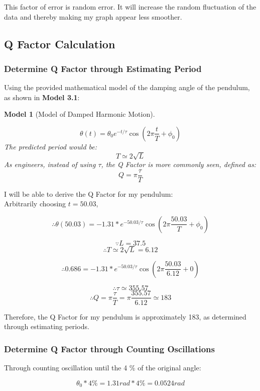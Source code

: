 \documentclass{article}
\newtheorem{theorem}{Model}[section]
\begin{document}
\noindent This factor of error is random error. It will increase the random fluctuation of the data and thereby making my graph appear less smoother.

\subsection{Q Factor Calculation}
\subsubsection{Determine Q Factor through Estimating Period}

Using the provided mathematical model of the damping angle of the pendulum, as shown in \textbf{Model 3.1}:

\begin{theorem}[Model of Damped Harmonic Motion] ~ %

 \[\theta(t) = \theta_0 e^{-t/\tau} \cos(2\pi \frac{t}{T}+\phi_0)\] \label{model_1}
The predicted period would be: \[T\simeq2\sqrt{L}\] \label{model_2}
As engineers, instead of using $\tau$, the Q Factor is more commonly seen, defined as: \[Q=\pi\frac{\tau}{T}\] \label{model_3}

\end{theorem}

\noindent I will be able to derive the Q Factor for my pendulum:\\

Arbitrarily choosing $t = 50.03$,

\[\therefore \theta(50.03) = -1.31* e^{-50.03/\tau} \cos(2\pi \frac{50.03}{T}+\phi_0)\] 

$$ \because L = 37.5$$
$$ \therefore T\simeq2\sqrt{L} = 6.12 $$

\[\therefore 0.686 = -1.31* e^{-50.03/\tau} \cos(2\pi \frac{50.03}{6.12}+0)\]

$$ \therefore \tau \simeq 355.57 $$
$$ \therefore Q=\pi \frac{\tau}{T}=\pi \frac{355.57}{6.12} \simeq 183$$

\noindent Therefore, the Q Factor for my pendulum is approximately 183, as determined through estimating periods.
\subsubsection{Determine Q Factor through Counting Oscillations}

Through counting oscillation until the 4 \% of the original angle:

\[ \theta_0 * 4 \% = 1.31rad * 4 \% = 0.0524rad \]
\end{document}
